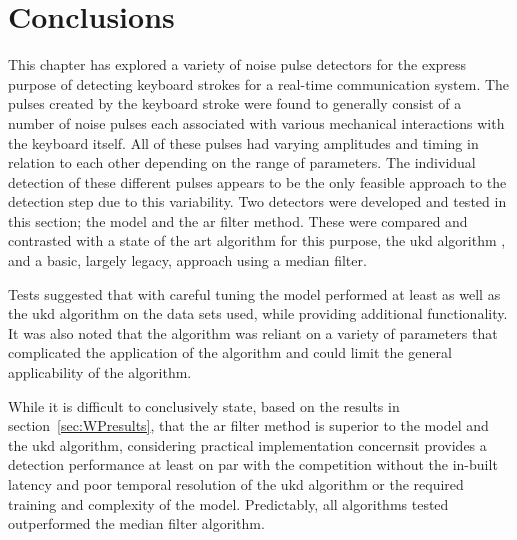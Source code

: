 \section{Conclusions}\label{sec:WPconclusions}

This chapter has explored a variety of noise pulse detectors for the express purpose of detecting keyboard strokes for a real-time communication system. The pulses created by the keyboard stroke were found to generally consist of a number of noise pulses each associated with various mechanical interactions with the keyboard itself. All of these pulses had varying amplitudes and timing in relation to each other depending on the range of parameters. The individual detection of these different pulses appears to be the only feasible approach to the detection step due to this variability. Two detectors were developed and tested in this section; the \DIFdelbegin {}\DIFdelend \DIFaddbegin {}\DIFaddend model and the \DIFdelbegin {}\DIFdelend \DIFaddbegin \gls{ar} \DIFaddend filter method. These were compared and contrasted with a state of the art algorithm for this purpose, the \DIFdelbegin {}\DIFdelend \DIFaddbegin \gls{ukd} \DIFaddend algorithm \cite{Subramanya2007}, and a basic, largely legacy, approach using a median filter.

Tests suggested that with careful tuning the \DIFdelbegin {}\DIFdelend \DIFaddbegin {}\DIFaddend model performed at least as well as the \DIFdelbegin {}\DIFdelend \DIFaddbegin \gls{ukd} \DIFaddend algorithm on the data sets used, while providing additional functionality. It was also noted that the algorithm was reliant on a variety of parameters that complicated the application of the algorithm and could limit the general applicability of the algorithm.

While it is difficult to conclusively state, based on the results in section~\ref{sec:WPresults}, that the \DIFdelbegin {}\DIFdelend \DIFaddbegin \gls{ar} \DIFaddend filter method is superior to the \DIFdelbegin {}\DIFdelend \DIFaddbegin {}\DIFaddend model and the \DIFdelbegin {}\DIFdelend \DIFaddbegin \gls{ukd} \DIFaddend algorithm, considering practical implementation concerns\DIFaddbegin \DIFadd{, }\DIFaddend it provides a detection performance at least on par with the competition without the in-built latency and poor temporal resolution of the \DIFdelbegin {}\DIFdelend \DIFaddbegin \gls{ukd} \DIFaddend algorithm or the required training and complexity of the \DIFdelbegin {}\DIFdelend \DIFaddbegin {}\DIFaddend model. Predictably, all algorithms tested outperformed the median filter algorithm.

